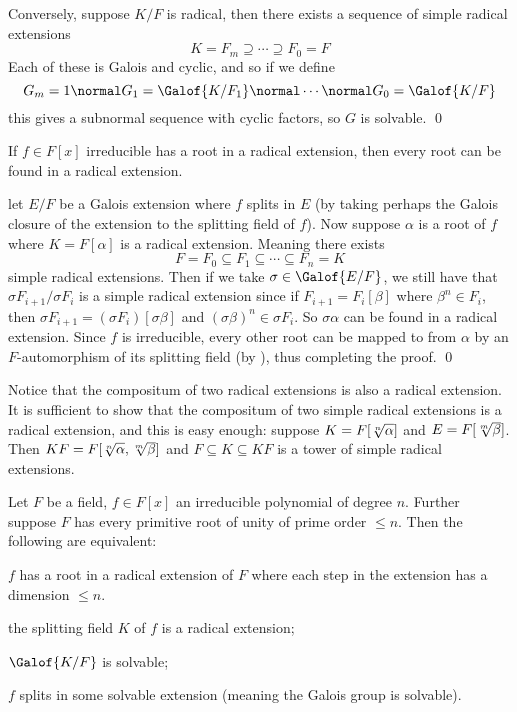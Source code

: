 Conversely, suppose $K/F$ is radical, then there exists a sequence of simple radical extensions
$$ K = F_m \supseteq \cdots \supseteq F_0 = F $$
Each of these is Galois and cyclic, and so if we define
$$ G_m = 1 \normal G_1 = \Galof{K/F_1} \normal \cdots \normal G_0 = \Galof{K/F} $$
this gives a subnormal sequence with cyclic factors, so $G$ is solvable.
\qed

\blemm

    If $f\in F[x]$ irreducible has a root in a radical extension, then every root can be found in a radical extension.

\elemm

\Proof let $E/F$ be a Galois extension where $f$ splits in $E$ (by taking perhaps the Galois closure of the extension to the splitting field of $f$).
Now suppose $\alpha$ is a root of $f$ where $K=F[\alpha]$ is a radical extension.
Meaning there exists
$$ F = F_0 \subseteq F_1 \subseteq \cdots \subseteq F_n = K $$
simple radical extensions.
Then if we take $\sigma\in\Galof{E/F}$, we still have that $\sigma F_{i+1}/\sigma F_i$ is a simple radical extension since if $F_{i+1}=F_i[\beta]$ where $\beta^n\in F_i$, then
$\sigma F_{i+1}=(\sigma F_i)[\sigma\beta]$
and $(\sigma\beta)^n\in\sigma F_i$.
So $\sigma\alpha$ can be found in a radical extension.
Since $f$ is irreducible, every other root can be mapped to from $\alpha$ by an $F$-automorphism of its splitting field (by ), thus completing the proof.
\qed

Notice that the compositum of two radical extensions is also a radical extension.
It is sufficient to show that the compositum of two simple radical extensions is a radical extension, and this is easy enough: suppose $K=F[\root n\of\alpha]$ and $E=F[\root m\of\beta]$.
Then $KF=F[\root n\of\alpha,\root m\of\beta]$ and $F\subseteq K\subseteq KF$ is a tower of simple radical extensions.

\bthrm

    Let $F$ be a field, $f\in F[x]$ an irreducible polynomial of degree $n$.
    Further suppose $F$ has every primitive root of unity of prime order $\leq n$.
    Then the following are equivalent:
    \benum
        \item $f$ has a root in a radical extension of $F$ where each step in the extension has a dimension $\leq n$.
        \item the splitting field $K$ of $f$ is a radical extension;
        \item $\Galof{K/F}$ is solvable;
        \item $f$ splits in some solvable extension (meaning the Galois group is solvable).
    \eenum

